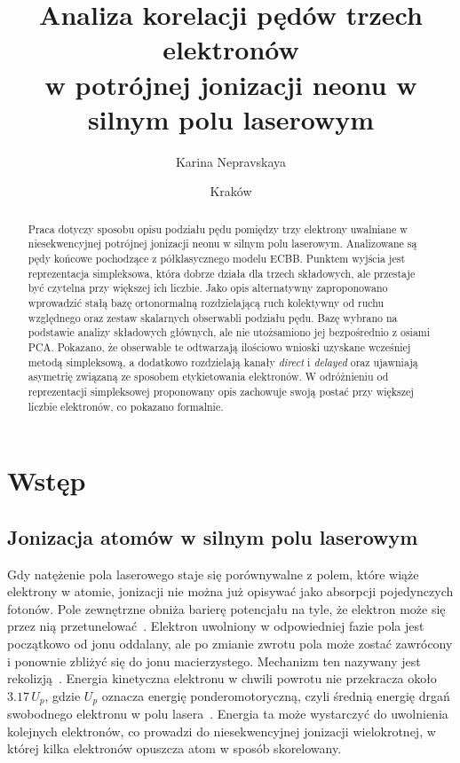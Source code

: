 \documentclass[12pt,a4paper]{article}
\title{\textbf{Analiza korelacji pędów trzech elektronów\\
w potrójnej jonizacji neonu w silnym polu laserowym}}
\author{Karina Nepravskaya}
\date{Kraków \the\year}
\begin{document}
\maketitle

\begin{abstract}
\noindent
Praca dotyczy sposobu opisu podziału pędu pomiędzy trzy elektrony
uwalniane w niesekwencyjnej potrójnej jonizacji neonu w silnym polu
laserowym. Analizowane są pędy końcowe pochodzące z
półklasycznego modelu ECBB. Punktem wyjścia jest reprezentacja
simpleksowa, która dobrze działa dla trzech składowych, ale przestaje
być czytelna przy większej ich liczbie. Jako opis alternatywny zaproponowano wprowadzić
stałą bazę ortonormalną rozdzielającą ruch kolektywny od
ruchu względnego oraz zestaw skalarnych obserwabli podziału pędu.
Bazę wybrano na podstawie analizy składowych głównych, ale nie
utożsamiono jej bezpośrednio z osiami PCA. Pokazano, że obserwable te odtwarzają
ilościowo wnioski uzyskane wcześniej metodą simpleksową, a
dodatkowo rozdzielają kanały \emph{direct} i \emph{delayed} oraz
ujawniają asymetrię związaną ze sposobem etykietowania
elektronów. W odróżnieniu od reprezentacji simpleksowej proponowany opis
zachowuje swoją postać przy większej liczbie elektronów, co pokazano
formalnie.
\end{abstract}

\tableofcontents
\newpage

\section{Wstęp}

\subsection{Jonizacja atomów w silnym polu laserowym}

Gdy natężenie pola laserowego staje się porównywalne z polem, które
wiąże elektrony w atomie, jonizacji nie można już opisywać jako
absorpcji pojedynczych fotonów. Pole zewnętrzne obniża barierę
potencjału na tyle, że elektron może się przez nią
przetunelować~\cite{Ammosov1986}. Elektron uwolniony w odpowiedniej
fazie pola jest początkowo od jonu oddalany, ale po zmianie zwrotu pola
może zostać zawrócony i ponownie zbliżyć się do jonu macierzystego.
Mechanizm ten nazywany jest rekolizją~\cite{Corkum1993,KrauszIvanov2009}.
Energia kinetyczna elektronu w chwili powrotu nie przekracza około
\(\num{3.17}\,U_p\), gdzie \(U_p\) oznacza energię ponderomotoryczną,
czyli średnią energię drgań swobodnego elektronu w polu
lasera~\cite{Corkum1993}. Energia ta może wystarczyć do uwolnienia
kolejnych elektronów, co prowadzi do niesekwencyjnej jonizacji
wielokrotnej, w której kilka elektronów opuszcza atom w sposób
skorelowany.
\end{document}
